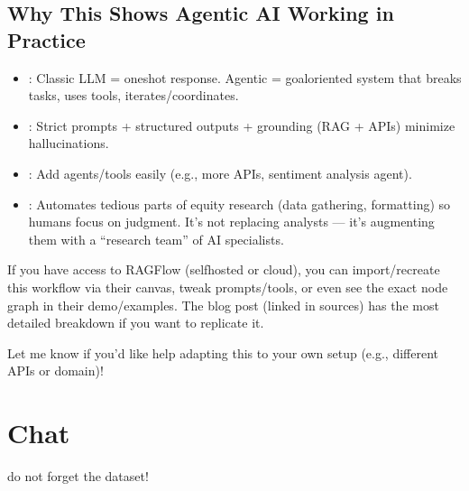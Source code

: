 \documentclass[letterpaper,10pt,english]{sphinxmanual}
\begin{document}
\section{Why This Shows Agentic AI Working in Practice}
\label{\detokenize{agentic-example:why-this-shows-agentic-ai-working-in-practice}}\begin{itemize}
\item {} 
\sphinxAtStartPar
{}: Classic LLM = one\sphinxhyphen{}shot response. Agentic =
goal\sphinxhyphen{}oriented system that breaks tasks, uses tools,
iterates/coordinates.

\item {} 
\sphinxAtStartPar
{}: Strict prompts + structured outputs + grounding (RAG
+ APIs) minimize hallucinations.

\item {} 
\sphinxAtStartPar
{}: Add agents/tools easily (e.g., more APIs, sentiment
analysis agent).

\item {} 
\sphinxAtStartPar
{}: Automates tedious parts of equity
research (data gathering, formatting) so humans focus on judgment.
It’s not replacing analysts — it’s augmenting them with a “research
team” of AI specialists.

\end{itemize}

\sphinxAtStartPar
If you have access to RAGFlow (self\sphinxhyphen{}hosted or cloud), you can
import/recreate this workflow via their canvas, tweak prompts/tools, or
even see the exact node graph in their demo/examples. The blog post
(linked in sources) has the most detailed breakdown if you want to
replicate it.

\sphinxAtStartPar
Let me know if you’d like help adapting this to your own setup (e.g.,
different APIs or domain)!

\sphinxstepscope


\chapter{Chat}
\label{\detokenize{chat:chat}}\label{\detokenize{chat::doc}}
\sphinxAtStartPar
do not forget the dataset!

\begin{figure}[htbp]
\centering

\noindent{}
\end{figure}
\end{document}
